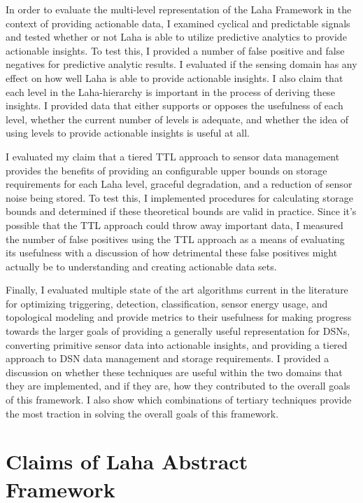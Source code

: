 In order to evaluate the multi-level representation of the Laha Framework in the context of providing actionable data, I examined cyclical and predictable signals and tested whether or not Laha is able to utilize predictive analytics to provide actionable insights. To test this, I provided a number of false positive and false negatives for predictive analytic results. I evaluated if the sensing domain has any effect on how well Laha is able to provide actionable insights. I also claim that each level in the Laha-hierarchy is important in the process of deriving these insights. I provided data that either supports or opposes the usefulness of each level, whether the current number of levels is adequate, and whether the idea of using levels to provide actionable insights is useful at all.

I evaluated my claim that a tiered TTL approach to sensor data management provides the benefits of providing an configurable upper bounds on storage requirements for each Laha level, graceful degradation, and a reduction of sensor noise being stored. To test this, I implemented procedures for calculating storage bounds and determined if these theoretical bounds are valid in practice. Since it's possible that the TTL approach could throw away important data, I measured the number of false positives using the TTL approach as a means of evaluating its usefulness with a discussion of how detrimental these false positives might actually be to understanding and creating actionable data sets.

Finally, I evaluated multiple state of the art algorithms current in the literature for optimizing triggering, detection, classification, sensor energy usage, and topological modeling and provide metrics to their usefulness for making progress towards the larger goals of providing a generally useful representation for DSNs, converting primitive sensor data into actionable insights, and providing a tiered approach to DSN data management and storage requirements. I provided a discussion on whether these techniques are useful within the two domains that they are implemented, and if they are, how they contributed to the overall goals of this framework. I also show which combinations of tertiary techniques provide the most traction in solving the overall goals of this framework.

\section{Claims of Laha Abstract Framework}\label{sec:anticipated-contributions-of-laha}

